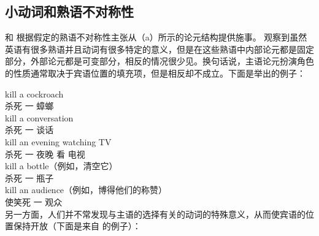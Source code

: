 \subsection{小动词和熟语不对称性}
\label{idiom-asym}

\mbox{} \citet{Marantz84a}和 \citet{Kratzer96a}根据假定的熟语不对称性主张从（a）所示的论元结构提供施事。 \citet{Marantz84a}观察到虽然英语有很多熟语并且动词有很多特定的意义，但是在这些熟语中内部论元都是固定部分，外部论元都是可变部分，相反的情况很少见。换句话说，主语论元扮演角色的性质通常取决于宾语位置的填充项，但是相反却不成立。下面是\citet[]{Kratzer96a}举出的例子：

\eal
\ex 
\gll kill a cockroach\\
     杀死 一 蟑螂\\
\ex 
\gll kill a conversation\\
    杀死 一 谈话\\
\ex 
\gll kill an evening watching TV\\
     杀死 一 夜晚 看 电视\\
\ex 
\gll kill a bottle（例如，清空它）\\
     杀死 一 瓶子\\
\ex 
\gll kill an audience（例如，博得他们的称赞） \\
     使笑死 一 观众\\
\zl
另一方面，人们并不常发现与主语的选择有关的动词的特殊意义，从而使宾语的位置保持开放（下面是来自 的例子）：

